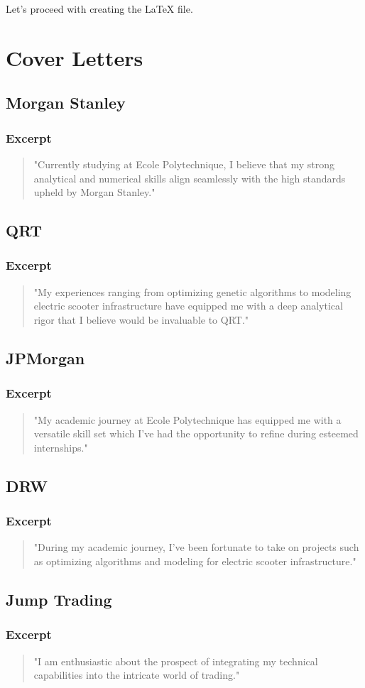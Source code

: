 Let's proceed with creating the LaTeX file.\documentclass{article}
\begin{document}
\section{Cover Letters}
\subsection{Morgan Stanley}
\subsubsection{Excerpt}
\begin{quote}
"Currently studying at Ecole Polytechnique, I believe that my strong analytical and numerical skills align seamlessly with the high standards upheld by Morgan Stanley."
\end{quote}

\subsection{QRT}
\subsubsection{Excerpt}
\begin{quote}
"My experiences ranging from optimizing genetic algorithms to modeling electric scooter infrastructure have equipped me with a deep analytical rigor that I believe would be invaluable to QRT."
\end{quote}

\subsection{JPMorgan}
\subsubsection{Excerpt}
\begin{quote}
"My academic journey at Ecole Polytechnique has equipped me with a versatile skill set which I've had the opportunity to refine during esteemed internships."
\end{quote}

\subsection{DRW}
\subsubsection{Excerpt}
\begin{quote}
"During my academic journey, I've been fortunate to take on projects such as optimizing algorithms and modeling for electric scooter infrastructure."
\end{quote}

\subsection{Jump Trading}
\subsubsection{Excerpt}
\begin{quote}
"I am enthusiastic about the prospect of integrating my technical capabilities into the intricate world of trading."
\end{quote}
\end{document}
